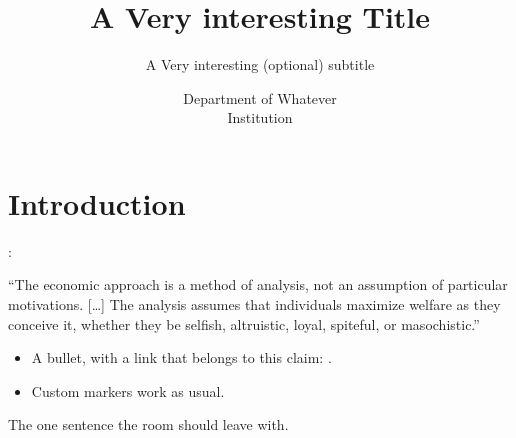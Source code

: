 \documentclass[10pt]{beamer}
\title[Main Title Footer] %
{A Very interesting Title}
\subtitle{A Very interesting (optional) subtitle}
\institute[] %
{}%
\date[Place/Conference Topic]%
{Department of Whatever \\[0.1em]
Institution\\[1em]
\DTMdate{2023-01-01}}
\begin{document}

\titleframe

\outlineframe


\section{Introduction}

\outlineframe[toc=currentsection]

\begin{contentframe}[title=Introduction, subtitle=A Smart subtitle,
                     label=slide:introduction]

    \citet[p. 385]{bib:becker1993}:

    \begin{displayquote}
        ``The economic approach is a method of analysis, not an assumption of
        particular motivations. [\ldots] The analysis assumes that individuals
        maximize welfare as they conceive it, whether they be selfish,
        altruistic, loyal, spiteful, or masochistic.''
    \end{displayquote}

    \begin{itemize}
        \item A bullet, with a link that belongs to this claim:
              .
        \item[$\rightarrow$] Custom markers work as usual.
    \end{itemize}

\end{contentframe}

\begin{standoutframe}
    The one sentence the room should leave with.
\end{standoutframe}
\end{document}
